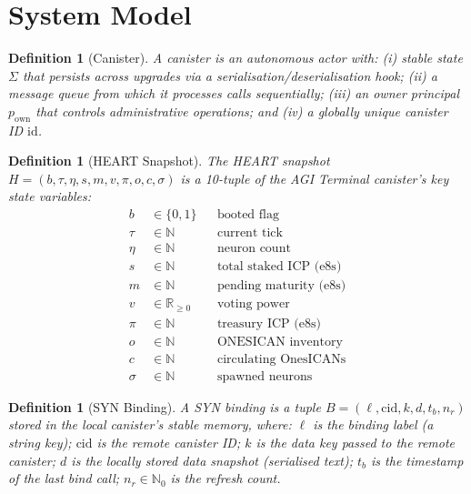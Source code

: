 \documentclass[12pt]{article}
\newtheorem{definition}[theorem]{Definition}
\begin{document}
\section{System Model}
\label{sec:model}

\begin{definition}[Canister]
  A \emph{canister} is an autonomous actor with: (i) stable state $\Sigma$ that
  persists across upgrades via a serialisation/deserialisation hook;
  (ii) a message queue from which it processes calls sequentially;
  (iii) an owner principal $p_\text{own}$ that controls administrative
  operations; and (iv) a globally unique canister ID $\mathrm{id}$.
\end{definition}

\begin{definition}[HEART Snapshot]
  The \emph{HEART snapshot} $H = (b, \tau, \eta, s, m, v, \pi, o, c, \sigma)$
  is a 10-tuple of the AGI Terminal canister's key state variables:
  \begin{align*}
    b &\in \{0,1\} && \text{booted flag} \\
    \tau &\in \mathbb{N} && \text{current tick} \\
    \eta &\in \mathbb{N} && \text{neuron count} \\
    s &\in \mathbb{N} && \text{total staked ICP (e8s)} \\
    m &\in \mathbb{N} && \text{pending maturity (e8s)} \\
    v &\in \mathbb{R}_{\ge 0} && \text{voting power} \\
    \pi &\in \mathbb{N} && \text{treasury ICP (e8s)} \\
    o &\in \mathbb{N} && \text{ONESICAN inventory} \\
    c &\in \mathbb{N} && \text{circulating OnesICANs} \\
    \sigma &\in \mathbb{N} && \text{spawned neurons}
  \end{align*}
\end{definition}

\begin{definition}[SYN Binding]
  A \emph{SYN binding} is a tuple
  $B = (\ell, \mathrm{cid}, k, d, t_b, n_r)$ stored in the local canister's
  stable memory, where:
  $\ell$ is the binding label (a string key);
  $\mathrm{cid}$ is the remote canister ID;
  $k$ is the data key passed to the remote canister;
  $d$ is the locally stored data snapshot (serialised text);
  $t_b$ is the timestamp of the last bind call;
  $n_r \in \mathbb{N}_0$ is the refresh count.
\end{definition}
\end{document}
